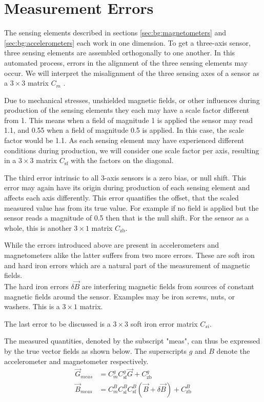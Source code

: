 \section{Measurement Errors \label{sec:bg:measurement_errors}}
The sensing elements described in sections \ref{sec:bg:magnetometers} and \ref{sec:bg:accelerometers} each work in one dimension. To get a three-axis sensor, three sensing elements are assembled orthogonally to one another. In this automated process, errors in the alignment of the three sensing elements may occur. We will interpret the misalignment of the three sensing axes of a sensor as a $3\times3$ matrix $C_{m}$ \parencite{magcal}\parencite{non-orthonogality}.

Due to mechanical stresses, unshielded magnetic fields, or other influences during production of the sensing elements they each may have a scale factor different from 1. This means when a field of magnitude 1 is applied the sensor may read 1.1, and 0.55 when a field of magnitude 0.5 is applied. In this case, the scale factor would be 1.1. As each sensing element may have experienced different conditions during production, we will consider one scale factor per axis, resulting in a $3\times3$ matrix $C_{\mathrm{sf}}$ with the factors on the diagonal.

The third error intrinsic to all 3-axis sensors is a zero bias, or null shift. This error may again have its origin during production of each sensing element and affects each axis differently. This error quantifies the offset, that the scaled measured value has from its true value. For example if no field is applied but the sensor reads a magnitude of 0.5 then that is the null shift. For the sensor as a whole, this is another $3\times1$ matrix $C_{\mathrm{zb}}$.

While the errors introduced above are present in accelerometers and magnetometers alike the latter suffers from two more errors. These are soft iron and hard iron errors which are a natural part of the measurement of magnetic fields.\\
The hard iron errors $\delta\vec{B}$ are interfering magnetic fields from sources of constant magnetic fields around the sensor. Examples may be iron screws, nuts, or washers. This is a $3\times1$ matrix.

The last error to be discussed is a $3\times3$ soft iron error matrix $C_{si}$.

The measured quantities, denoted by the subscript "meas", can thus be expressed by the true vector fields as shown below. The superscripts $g$ and $B$ denote the accelerometer and magnetometer respectively.
\begin{align}
    \vec{G}_{meas}&=C^g_mC^g_{\mathrm{sf}}\vec G+C_{\mathrm{zb}}^g \label{eq:bg:g_with_errors}\\
    \vec{B}_{meas}&=C^B_mC^B_{\mathrm{si}}C^B_{\mathrm{sf}}(\vec{B}+\delta\vec{B})+C_{\mathrm{zb}}^B
    \label{eq:bg:b_with_errors}
\end{align}

